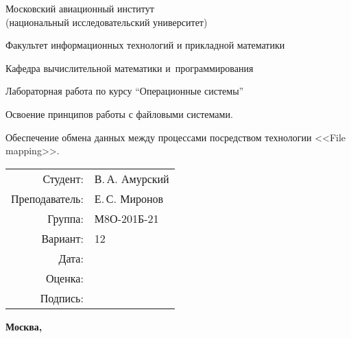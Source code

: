 \documentclass[pdf, unicode, 12pt, a4paper,oneside,fleqn]{article}
\begin{document}
\begin{titlepage}
    \begin{center}
        \bfseries

        {\Large Московский авиационный институт\\ (национальный исследовательский университет)}
        
        \vspace{48pt}
        
        {\large Факультет информационных технологий и прикладной математики}
        
        \vspace{36pt}
        
        {\large Кафедра вычислительной математики и~программирования}
        
        \vspace{48pt}
        
        Лабораторная работа  по курсу \enquote{Операционные системы}

        \vspace{48pt}

        Освоение принципов работы с файловыми системами. 
        
        Обеспечение обмена данных между процессами посредством технологии <<File mapping>>.
    \end{center}
    
    \vspace{125pt}
    
    \begin{flushright}
    \begin{tabular}{rl}
    Студент: & В.\,А. Амурский \\
    Преподаватель: & Е.\,С. Миронов \\
    Группа: & М8О-201Б-21 \\
    Вариант: & 12 \\
    Дата: & \\
    Оценка: & \\
    Подпись: & \\
    \end{tabular}
    \end{flushright}
    
    \vfill
    
    \begin{center}
    \bfseries
    Москва, \the\year
    \end{center}
\end{titlepage}
    
\end{document}
